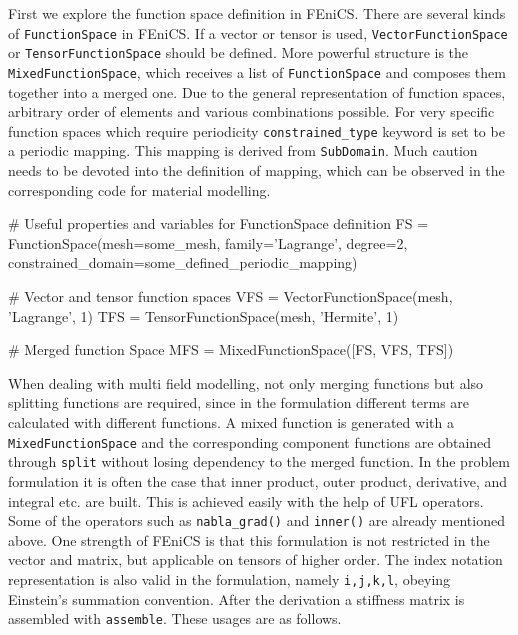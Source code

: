 \documentclass[10pt,a4paper]{scrreprt}
\begin{document}
First we explore the function space definition in FEniCS. There are several kinds of \texttt{FunctionSpace} in FEniCS. If a vector or tensor is used, \texttt{VectorFunctionSpace} or \texttt{TensorFunctionSpace} should be defined. More powerful structure is the \texttt{MixedFunctionSpace}, which receives a list of \texttt{FunctionSpace} and composes them together into a merged one. Due to the general representation of function spaces, arbitrary order of elements and various combinations possible. For very specific function spaces which require periodicity \texttt{constrained\_type} keyword is set to be a periodic mapping. This mapping is derived from \texttt{SubDomain}. Much caution needs to be devoted into the definition of mapping, which can be observed in the corresponding code for material modelling.

\begin{python}
# Useful properties and variables for FunctionSpace definition
FS = FunctionSpace(mesh=some_mesh, family='Lagrange', degree=2, constrained_domain=some_defined_periodic_mapping)

# Vector and tensor function spaces
VFS = VectorFunctionSpace(mesh, 'Lagrange', 1)
TFS = TensorFunctionSpace(mesh, 'Hermite', 1)

# Merged function Space
MFS = MixedFunctionSpace([FS, VFS, TFS])
\end{python}

When dealing with multi field modelling, not only merging functions but also splitting functions are required, since in the formulation different terms are calculated with different functions. A mixed function is generated with a \texttt{MixedFunctionSpace} and the corresponding component functions are obtained through \texttt{split} without losing dependency to the merged function. In the problem formulation it is often the case that inner product, outer product, derivative, and integral etc. are built. This is achieved easily with the help of UFL operators. Some of the operators such as \texttt{nabla\_grad()} and \texttt{inner()} are already mentioned above. One strength of FEniCS is that this formulation is not restricted in the vector and matrix, but applicable on tensors of higher order. The index notation representation is also valid in the formulation, namely \texttt{i,j,k,l}, obeying Einstein's summation convention. After the derivation a stiffness matrix is assembled with \texttt{assemble}. These usages are as follows.
\end{document}
